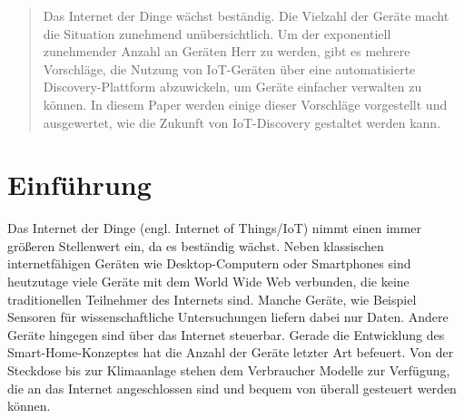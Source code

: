 \documentclass[conference,compsoc]{IEEEtran}
\begin{document}




\maketitle

\begin{abstract}
Das Internet der Dinge wächst beständig. Die Vielzahl der Geräte macht die Situation zunehmend unübersichtlich. Um der exponentiell zunehmender Anzahl an Geräten Herr zu werden, gibt es mehrere Vorschläge, die Nutzung von IoT-Geräten über eine automatisierte Discovery-Plattform abzuwickeln, um Geräte einfacher verwalten zu können. In diesem Paper werden einige dieser Vorschläge vorgestellt und ausgewertet, wie die Zukunft von IoT-Discovery gestaltet werden kann.
\end{abstract}





%
\IEEEpeerreviewmaketitle



\section{Einführung}
Das Internet der Dinge (engl. Internet of Things/IoT) nimmt einen immer größeren Stellenwert ein, da es beständig wächst. Neben klassischen internetfähigen Geräten wie Desktop-Computern oder Smartphones sind heutzutage viele Geräte mit dem World Wide Web verbunden, die keine traditionellen Teilnehmer des Internets sind. Manche Geräte, wie Beispiel Sensoren für wissenschaftliche Untersuchungen liefern dabei nur Daten. Andere Geräte hingegen sind über das Internet steuerbar.
Gerade die Entwicklung des Smart-Home-Konzeptes hat die Anzahl der Geräte letzter Art befeuert. Von der Steckdose bis zur Klimaanlage stehen dem Verbraucher Modelle zur Verfügung, die an das Internet angeschlossen sind und bequem von überall gesteuert werden können.
\end{document}
